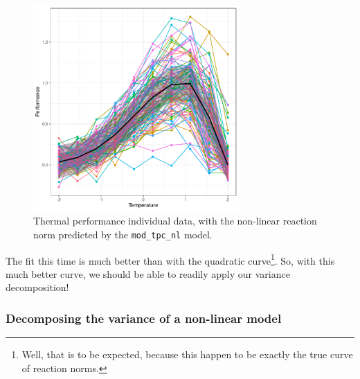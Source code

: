 \documentclass[a4paper,12pt,twoside]{article}
\begin{document}
\begin{figure}[h!]
  \includegraphics[width = 0.7\textwidth]{TPC_discrete_nonlinear_pred.pdf}
  \caption{Thermal performance individual data, with the non-linear reaction norm predicted by the \texttt{mod\_tpc\_nl} model.}
  \label{fig_pred_tpc_nl}
\end{figure}
The fit this time is much better than with the quadratic curve\footnote{Well, that is to be expected, because this happen to be exactly the true curve of reaction norms.}. So, with this much better curve, we should be able to readily apply our variance decomposition!

\subsubsection{Decomposing the variance of a non-linear model}
\end{document}
